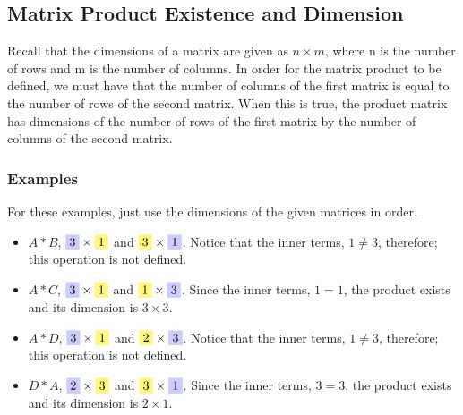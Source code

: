 \documentclass[14pt]{extarticle}
\newcommand{\yhighlight}[1]{%
	\colorbox{yellow!50}{$\displaystyle#1$}}
\newcommand{\bhighlight}[1]{%
	\colorbox{blue!20}{$\displaystyle#1$}}
\begin{document}
\subsection{Matrix Product Existence and Dimension}
Recall that the dimensions of a matrix are given as $n\times m$, where n is the number of rows and m is the number of columns. In order for the matrix product to be defined, we must have that the \colorbox{yellow!50}{number of columns of the first} matrix is equal to the \colorbox{yellow!50}{number of rows of the second} matrix. When this is true, the product matrix has dimensions of the \colorbox{blue!20}{number of rows of the first} matrix by the \colorbox{blue!20}{number of columns of the second} matrix.
\subsubsection*{Examples}
For these examples, just use the dimensions of the given matrices in order.
\begin{itemize}
	\item $A * B$, $\bhighlight{3}\times \yhighlight{1}$ and $\yhighlight{3} \times \bhighlight{1}$. Notice that the inner terms, $1\neq 3$, therefore; this operation is not defined.
	\item $A * C$, $\bhighlight{3} \times \yhighlight{1}$ and  $\yhighlight{1}\times \bhighlight{3}$. Since the inner terms, $1 = 1$, the product exists and its dimension is $3\times 3$.
	\item $A * D$, $\bhighlight{3}\times \yhighlight{1}$ and $\yhighlight{2} \times \bhighlight{3}$. Notice that the inner terms, $1\neq 3$, therefore; this operation is not defined.
	\item $D * A$, $\bhighlight{2} \times \yhighlight{3}$ and  $\yhighlight{3}\times \bhighlight{1}$. Since the inner terms, $3 = 3$, the product exists and its dimension is $2\times 1$.
\end{itemize}
\end{document}
